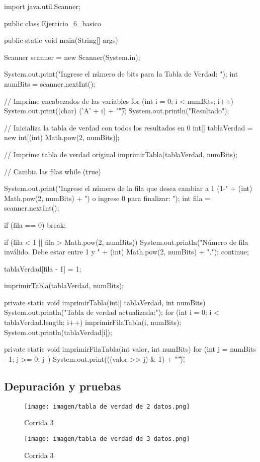 \begin{javaCode}
import java.util.Scanner;

public class Ejercicio_6_basico {
    public static void main(String[] args) {
        Scanner scanner = new Scanner(System.in);
        
        System.out.print("Ingrese el número de bits para la Tabla de Verdad: ");
        int numBits = scanner.nextInt();
        
        // Imprime encabezados de las variables
        for (int i = 0; i < numBits; i++) {
            System.out.print((char) ('A' + i) + "\t");
        }
        System.out.println("Resultado");
        
        // Inicializa la tabla de verdad con todos los resultados en 0
        int[] tablaVerdad = new int[(int) Math.pow(2, numBits)];
        
        // Imprime tabla de verdad original
        imprimirTabla(tablaVerdad, numBits);
        
        // Cambia las filas
        while (true) {
            System.out.print("Ingrese el número de la fila que desea cambiar a 1 (1-" + (int) Math.pow(2, numBits) + ") o ingrese 0 para finalizar: ");
            int fila = scanner.nextInt();
            
            if (fila == 0) {
                break;
            }
            
            if (fila < 1 || fila > Math.pow(2, numBits)) {
                System.out.println("Número de fila inválido. Debe estar entre 1 y " + (int) Math.pow(2, numBits) + ".");
                continue;
            }
            
            tablaVerdad[fila - 1] = 1;
            
            imprimirTabla(tablaVerdad, numBits);
        }
    }

    private static void imprimirTabla(int[] tablaVerdad, int numBits) {
        System.out.println("Tabla de verdad actualizada:");
        for (int i = 0; i < tablaVerdad.length; i++) {
            imprimirFilaTabla(i, numBits);
            System.out.println(tablaVerdad[i]);
        }
    }

    private static void imprimirFilaTabla(int valor, int numBits) {
        for (int j = numBits - 1; j >= 0; j--) {
            System.out.print(((valor >> j) & 1) + "\t");
        }
    }
}
\end{javaCode}

\subsection{Depuración y pruebas}

\begin {figure}[h!]
\centerline{\texttt{[image: imagen/tabla de verdad de 2 datos.png]}}
\caption{Corrida 3}
\label{fig}
\end {figure}

\begin {figure}[h!]
\centerline{\texttt{[image: imagen/tabla de verdad de 3 datos.png]}}
\caption{Corrida 3}
\label{fig}
\end {figure}